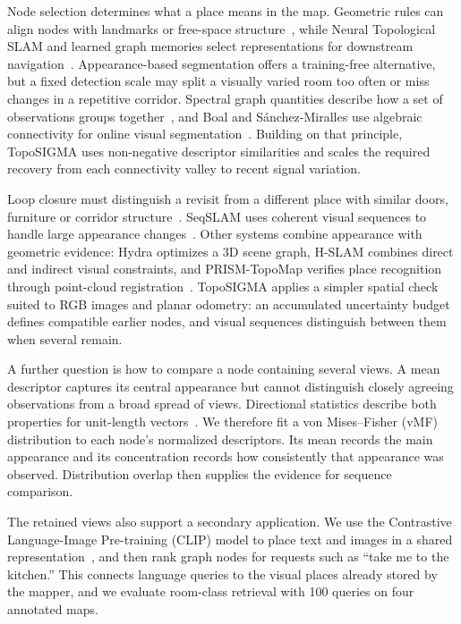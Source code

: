 \documentclass[5p,twocolumn,nonatbib,reversenotenum]{elsarticle}
\newcommand{\methodname}{TopoSIGMA\xspace}
\begin{document}
Node selection determines what a place means in the map. Geometric rules can align nodes with landmarks or free-space structure~\cite{Blochliger2018}, while Neural Topological SLAM and learned graph memories select representations for downstream navigation~\cite{Chaplot2020NeuralTopo,Kwon2021,Kim2023}. Appearance-based segmentation offers a training-free alternative, but a fixed detection scale may split a visually varied room too often or miss changes in a repetitive corridor. Spectral graph quantities describe how a set of observations groups together~\cite{Fiedler1973,Chung1997,vonLuxburg2007}, and Boal and S\'anchez-Miralles use algebraic connectivity for online visual segmentation~\cite{Boal2016}. Building on that principle, \methodname uses non-negative descriptor similarities and scales the required recovery from each connectivity valley to recent signal variation.

Loop closure must distinguish a revisit from a different place with similar doors, furniture or corridor structure~\cite{Lowry2016VPR}. SeqSLAM uses coherent visual sequences to handle large appearance changes~\cite{Milford2012SeqSLAM}. Other systems combine appearance with geometric evidence: Hydra optimizes a 3D scene graph, H-SLAM combines direct and indirect visual constraints, and PRISM-TopoMap verifies place recognition through point-cloud registration~\cite{Hughes2022,Younes2024,muravyev2025prism}. \methodname applies a simpler spatial check suited to RGB images and planar odometry: an accumulated uncertainty budget defines compatible earlier nodes, and visual sequences distinguish between them when several remain.

A further question is how to compare a node containing several views. A mean descriptor captures its central appearance but cannot distinguish closely agreeing observations from a broad spread of views. Directional statistics describe both properties for unit-length vectors~\cite{Mardia2000Directional}. We therefore fit a von Mises--Fisher (vMF) distribution to each node's normalized descriptors. Its mean records the main appearance and its concentration records how consistently that appearance was observed. Distribution overlap then supplies the evidence for sequence comparison.

The retained views also support a secondary application. We use the Contrastive Language-Image Pre-training (CLIP) model to place text and images in a shared representation~\cite{radford2021learningtransferablevisualmodels}, and then rank graph nodes for requests such as ``take me to the kitchen.'' This connects language queries to the visual places already stored by the mapper, and we evaluate room-class retrieval with 100 queries on four annotated maps.
\end{document}

